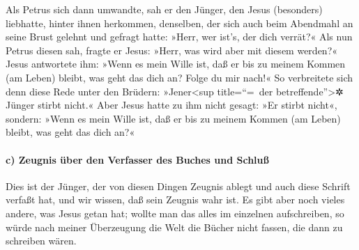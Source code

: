  Als Petrus sich dann umwandte, sah er den Jünger, den
Jesus (besonders) liebhatte, hinter ihnen herkommen, denselben, der sich
auch beim Abendmahl an seine Brust gelehnt und gefragt hatte: »Herr, wer
ist's, der dich verrät?«  Als nun Petrus diesen sah,
fragte er Jesus: »Herr, was wird aber mit diesem werden?«
 Jesus antwortete ihm: »Wenn es mein Wille ist, daß er
bis zu meinem Kommen (am Leben) bleibt, was geht das dich an? Folge du
mir nach!«  So verbreitete sich denn diese Rede unter den
Brüdern: »Jener\textless sup title=``=~der betreffende''\textgreater✲
Jünger stirbt nicht.« Aber Jesus hatte zu ihm nicht gesagt: »Er stirbt
nicht«, sondern: »Wenn es mein Wille ist, daß er bis zu meinem Kommen
(am Leben) bleibt, was geht das dich an?«

\hypertarget{c-zeugnis-uxfcber-den-verfasser-des-buches-und-schluuxdf}{%
\paragraph{c) Zeugnis über den Verfasser des Buches und
Schluß}\label{c-zeugnis-uxfcber-den-verfasser-des-buches-und-schluuxdf}}

 Dies ist der Jünger, der von diesen Dingen Zeugnis
ablegt und auch diese Schrift verfaßt hat, und wir wissen, daß sein
Zeugnis wahr ist.  Es gibt aber noch vieles andere, was
Jesus getan hat; wollte man das alles im einzelnen aufschreiben, so
würde nach meiner Überzeugung die Welt die Bücher nicht fassen, die dann
zu schreiben wären.
